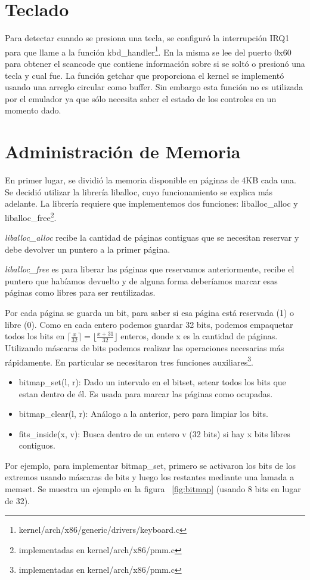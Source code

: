 \section{Teclado}\label{sec:teclado}
Para detectar cuando se presiona una tecla, se configuró la interrupción IRQ1 para que llame a la función kbd\_handler\footnote{kernel/arch/x86/generic/drivers/keyboard.c}. En la misma se lee del puerto 0x60 para obtener el scancode que contiene información sobre si se soltó o presionó una tecla y cual fue.
La función getchar que proporciona el kernel se implementó usando una arreglo circular como buffer. Sin embargo esta función no es utilizada por el emulador ya que sólo necesita saber el estado de los controles en un momento dado.

\section{Administración de Memoria}\label{sec:memory}
En primer lugar, se dividió la memoria disponible en páginas de 4KB cada una. Se decidió utilizar la librería liballoc, cuyo funcionamiento se explica más adelante. La librería requiere que implementemos dos funciones: liballoc\_alloc y liballoc\_free\footnote{implementadas en kernel/arch/x86/pmm.c}.

\emph{liballoc\_alloc} recibe la cantidad de páginas contiguas que se necesitan reservar y debe devolver un puntero a la primer página.

\emph{liballoc\_free} es para liberar las páginas que reservamos anteriormente, recibe el puntero que habíamos devuelto y de alguna forma deberíamos marcar esas páginas como libres para ser reutilizadas.

Por cada página se guarda un bit, para saber si esa página está reservada (1) o libre (0). Como en cada entero podemos guardar 32 bits, podemos empaquetar todos los bits en $\lceil\frac{x}{32}\rceil=\lfloor\frac{x+31}{32}\rfloor$ enteros, donde x es la cantidad de páginas. Utilizando máscaras de bits podemos realizar las operaciones necesarias más rápidamente. En particular se necesitaron tres funciones auxiliares\footnote{implementadas en kernel/arch/x86/pmm.c}.

\begin{itemize}
\item bitmap\_set(l, r): Dado un intervalo en el bitset, setear todos los bits que estan dentro de él. Es usada para marcar las páginas como ocupadas.
\item bitmap\_clear(l, r): Análogo a la anterior, pero para limpiar los bits.
\item fits\_inside(x, v): Busca dentro de un entero v (32 bits) si hay x bits libres contiguos. 
\end{itemize}
Por ejemplo, para implementar bitmap\_set, primero se activaron los bits de los extremos usando máscaras de bits y luego los restantes mediante una lamada a memset. Se muestra un ejemplo en la figura ~\ref{fig:bitmap} (usando 8 bits en lugar de 32).

